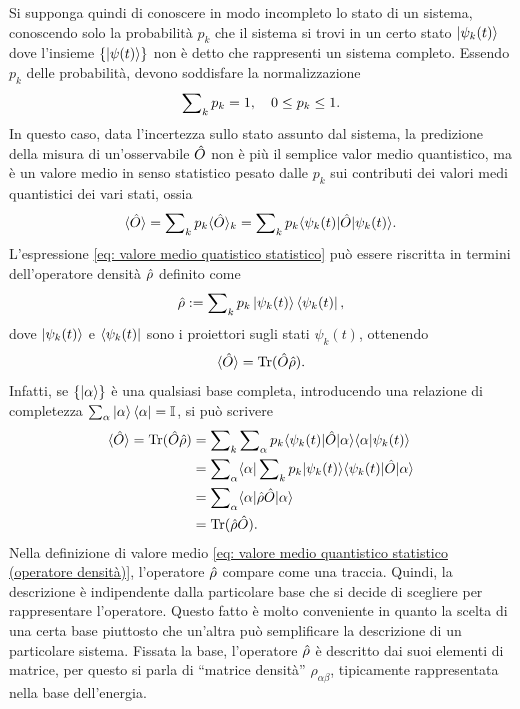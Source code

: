 Si supponga quindi di conoscere in modo incompleto lo stato di un sistema, conoscendo solo la probabilità $p_k$ che il sistema si trovi in un certo stato $\ket{\psi_k(t)}$ dove l'insieme $\{\ket{\psi(t)}\}$ non è detto che rappresenti un sistema completo. Essendo $p_k$ delle probabilità, devono soddisfare la normalizzazione 
\begin{equation}
\label{eq: normalizzazione pk}
    \sum\nolimits_k p_k = 1,\quad 0 \le p_k \le 1.
\end{equation}
In questo caso, data l'incertezza sullo stato assunto dal sistema, la predizione della misura di un'osservabile $\hat{O}$ non è più il semplice valor medio quantistico, ma è un valore medio in senso statistico pesato dalle $p_k$ sui contributi dei valori medi quantistici dei vari stati, ossia
\begin{equation}
\label{eq: valore medio quatistico statistico}
    \langle \hat{O} \rangle = \sum\nolimits_k p_k\langle \hat{O} \rangle_k = \sum\nolimits_k p_k\langle \psi_k(t) | \hat{O} | \psi_k(t) \rangle.
\end{equation}
L'espressione \eqref{eq: valore medio quatistico statistico} può essere riscritta in termini dell'operatore densità $\hat{\rho}$ definito come
\begin{equation}
\label{eq: definizione operatore densità}
    \hat{\rho} := \sum\nolimits_k p_k \ket{\psi_k(t)}\bra{\psi_k(t)},
\end{equation}
dove $\ket{\psi_k(t)}$ e $\bra{\psi_k(t)}$ sono i proiettori sugli stati $\psi_k(t)$, ottenendo
\begin{equation}
\label{eq: valore medio quantistico statistico (operatore densità)}
    \langle \hat{O} \rangle = \mathrm{Tr}(\hat{O}\hat{\rho}).
\end{equation}
Infatti, se $\{\ket{\alpha}\}$ è una qualsiasi base completa, introducendo una relazione di completezza $\sum\nolimits_\alpha\ket{\alpha}\bra{\alpha} = \mathbb{I}$, si può scrivere
\begin{equation}
    \begin{split}
        \langle \hat{O} \rangle = \mathrm{Tr}(\hat{O}\hat{\rho}) &= \sum\nolimits_k\sum\nolimits_\alpha p_k \langle \psi_k(t) | \hat{O} | \alpha \rangle\langle \alpha | \psi_k(t) \rangle \\
        &= \sum\nolimits_\alpha\langle \alpha | \sum\nolimits_k p_k | \psi_k(t) \rangle\langle \psi_k(t) | \hat{O} | \alpha \rangle \\
        &= \sum\nolimits_\alpha\langle \alpha | \hat{\rho}\hat{O} | \alpha \rangle \\
        &= \mathrm{Tr}(\hat{\rho}\hat{O}).
    \end{split}
\end{equation}
Nella definizione di valore medio \eqref{eq: valore medio quantistico statistico (operatore densità)}, l'operatore $\hat{\rho}$ compare come una traccia. Quindi, la descrizione è indipendente dalla particolare base che si decide di scegliere per rappresentare l'operatore. Questo fatto è molto conveniente in quanto la scelta di una certa base piuttosto che un'altra può semplificare la descrizione di un particolare sistema. Fissata la base, l'operatore $\hat{\rho}$ è descritto dai suoi elementi di matrice, per questo si parla di ``matrice densità'' $\rho_{\alpha\beta}$, tipicamente rappresentata nella base dell'energia. 

